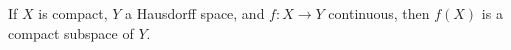 If $X$ is compact, $Y$ a Hausdorff space, and $f : X \to Y$ continuous, then $f(X)$ is a compact subspace of $Y$.
